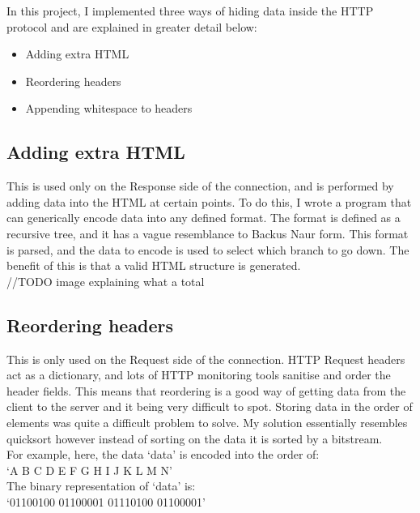\documentclass[12pt]{article}
\begin{document}
In this project, I implemented three ways of hiding data inside the HTTP protocol and are explained in greater detail below:
\begin{itemize}
    \item Adding extra HTML
    \item Reordering headers
    \item Appending whitespace to headers
\end{itemize}

\subsection{Adding extra HTML}
This is used only on the Response side of the connection, and is performed by adding data into the HTML at certain points. To do this, I wrote a program that can generically encode data into any defined format.
The format is defined as a recursive tree, and it has a vague resemblance to Backus Naur form.
This format is parsed, and the data to encode is used to select which branch to go down.
The benefit of this is that a valid HTML structure is generated.\\
//TODO image explaining what a total

\subsection{Reordering headers}
This is only used on the Request side of the connection.
HTTP Request headers act as a dictionary, and lots of HTTP monitoring tools sanitise and order the header fields. This means that reordering is a good way of getting data from the client to the server and it being very difficult to spot.
Storing data in the order of elements was quite a difficult problem to solve. My solution essentially resembles quicksort however instead of sorting on the data it is sorted by a bitstream.\\
For example, here, the data `data' is encoded into the order of:\\
`A B C D E F G H I J K L M N'\\
The binary representation of `data' is:\\
`01100100 01100001 01110100 01100001'

\end{document}
